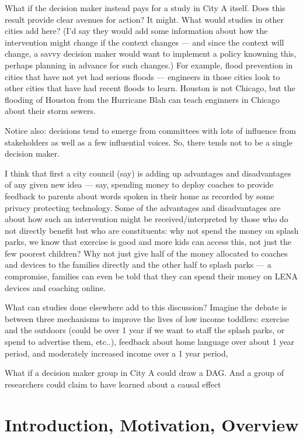 \documentclass[
]{article}
\begin{document}
What if the decision maker instead pays for a study in City A itself.
Does this result provide clear avenues for action? It might. What would
studies in other cities add here? (I'd say they would add some
information about how the intervention might change if the context
changes --- and since the context will change, a savvy decision maker
would want to implement a policy knowning this, perhaps planning in
advance for such changes.) For example, flood prevention in cities that
have not yet had serious floods --- engineers in those cities look to
other cities that have had recent floods to learn. Houston is not
Chicago, but the flooding of Houston from the Hurricane Blah can teach
enginners in Chicago about their storm sewers.

Notice also: decisions tend to emerge from committees with lots of
influence from stakeholders as well as a few influential voices. So,
there tends not to be a single decision maker.

I think that first a city council (say) is adding up advantages and
disadvantages of any given new idea --- say, spending money to deploy
coaches to provide feedback to parents about words spoken in their home
as recorded by some privacy protecting technology. Some of the
advantages and disadvantages are about how such an intervention might be
received/interpreted by those who do not directly benefit but who are
constituents: why not spend the money on splash parks, we know that
exercise is good and more kids can access this, not just the few poorest
children? Why not just give half of the money allocated to coaches and
devices to the families directly and the other half to splash parks ---
a compromise, families can even be told that they can spend their money
on LENA devices and coaching online.

What can studies done elsewhere add to this discussion? Imagine the
debate is between three mechanisms to improve the lives of low income
toddlers: exercise and the outdoors (could be over 1 year if we want to
staff the splash parks, or spend to advertise them, etc..), feedback
about home language over about 1 year period, and moderately increased
income over a 1 year period,

What if a decision maker group in City A could draw a DAG. And a group
of researchers could claim to have learned about a causal effect

\hypertarget{introduction-motivation-overview}{%
\section{Introduction, Motivation,
Overview}\label{introduction-motivation-overview}}
\end{document}
